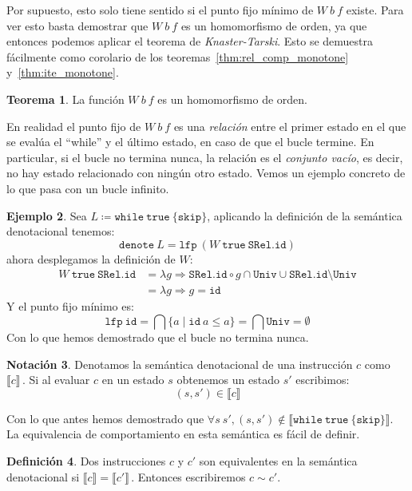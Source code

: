 \documentclass[
  a4paper, 
  10pt, 
  parskip=half, 
  toc=bibliography,
]{scrbook}
\theoremstyle{definition}
\theoremstyle{bolddef}
\newtheorem{theorem}{Teorema}[section]
\newtheorem{definition}[theorem]{Definición}
\newtheorem{notation}[theorem]{Notación}
\newtheorem{example}[theorem]{Ejemplo}
\newcommand{\funfont}[1]{\texttt{#1}}
\renewcommand{\mapsto}{\Rightarrow}
\newcommand{\ImpWhile}[2]{\texttt{while} \ {#1} \ \{{#2}\}}
\newcommand{\ImpSkip}{\texttt{skip}}
\newcommand{\ImpTrue}{\texttt{true}}
\newcommand{\Denote}[1]{\llbracket{} {#1} \rrbracket{}}
\begin{document}
Por supuesto, esto solo tiene sentido si el punto fijo mínimo de \(W \ b \ f\) existe.
Para ver esto basta demostrar que \(W \ b \ f\) es un homomorfismo de orden, 
ya que entonces podemos aplicar el teorema de \emph{Knaster-Tarski}. 
Esto se demuestra fácilmente como corolario de los teoremas~\ref{thm:rel_comp_monotone} y~\ref{thm:ite_monotone}.

\begin{theorem}
  La función \(W \ b \ f\) es un homomorfismo de orden.
\end{theorem}

En realidad el punto fijo de \(W \ b \ f\) es una \emph{relación} entre el primer
estado en el que se evalúa el \enquote{while} y el último estado, en caso de
que el bucle termine. En particular, si el bucle no termina nunca, la relación es el \emph{conjunto vacío},
es decir, no hay estado relacionado con ningún otro estado.
Vemos un ejemplo concreto de lo que pasa con un bucle infinito.

\begin{example}
Sea \(L \coloneqq \ImpWhile{\ImpTrue}{\ImpSkip}\),
aplicando la definición de la semántica denotacional tenemos:
\[
  \funfont{denote} \ L = \funfont{lfp} \ (W \ \ImpTrue \ \funfont{SRel.id})
\]
ahora desplegamos la definición de \(W\):
\begin{align*}
  W \ \ImpTrue \ \funfont{SRel.id} &= \lambda g \mapsto \funfont{SRel.id} \circ g \cap \funfont{Univ} \cup \funfont{SRel.id} \setminus \funfont{Univ} \\
    &= \lambda g \mapsto g = \funfont{id}
\end{align*}
Y el punto fijo mínimo es:
\[
  \funfont{lfp} \ \funfont{id} = \bigcap \{a \mid \funfont{id} \ a \leq a\} = 
    \bigcap \funfont{Univ} = \emptyset
\]
Con lo que hemos demostrado que el bucle no termina nunca.
\end{example}

\begin{notation}
  Denotamos la semántica denotacional de una instrucción \(c\) como
  \(\Denote{c}\,\). Si al evaluar \(c\) en un estado \(s\)
  obtenemos un estado \(s'\) escribimos:
  \[
    (s, s') \in \Denote{c}
  \]
\end{notation}

Con lo que antes hemos demostrado que \(\forall s \ s', (s, s') \notin \Denote{\ImpWhile{\ImpTrue}{\ImpSkip}}\).
La equivalencia de comportamiento en esta semántica es fácil de definir.

\begin{definition}
  Dos instrucciones \(c\) y \(c'\) son equivalentes en la semántica denotacional
  si \(\Denote{c} = \Denote{c'}\,\).
  Entonces escribiremos \(c \sim c'\).
\end{definition}
\end{document}

